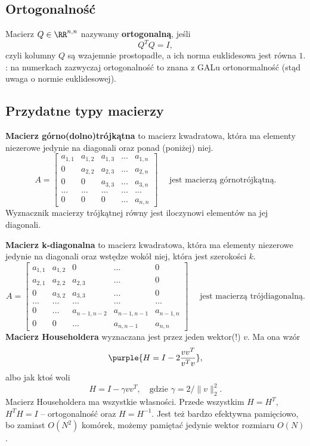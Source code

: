 \subsection{Ortogonalność}
Macierz $Q\in \RR^{n,n}$ nazywamy \textbf{ortogonalną}, jeśli
$$
Q^TQ=I,
$$
czyli kolumny $Q$ są wzajemnie prostopadłe, a ich norma euklidesowa jest równa $1$. : na numerkach zazwyczaj ortogonalność to znana z GALu ortonormalność (stąd uwaga o normie euklidesowej).

\subsection{Przydatne typy macierzy}
\textbf{Macierz górno(dolno)trójkątna} to macierz kwadratowa, która ma elementy niezerowe jedynie na diagonali oraz ponad (poniżej) niej. 
$$
A=\begin{bmatrix}
    a_{1,1} & a_{1,2} & a_{1,3} & \dots & a_{1,n} \\
    0 & a_{2,2} & a_{2,3} & \dots & a_{2,n} \\
    0 & 0 & a_{3,3} & \dots & a_{3,n} \\ 
    \dots & \dots & \dots & \dots & \dots \\
    0 & 0 & 0 & \dots & a_{n,n}
\end{bmatrix} \quad\mbox{ jest macierzą górnotrójkątną}.
$$
Wyznacznik macierzy trójkątnej równy jest iloczynowi elementów na jej diagonali.

\textbf{Macierz k-diagonalna} to macierz kwadratowa, która ma elementy niezerowe jedynie na diagonali oraz wstędze wokół niej, która jest szerokości $k$. 
$$
A=\begin{bmatrix}
    a_{1,1} & a_{1,2} & 0 & \dots & 0 \\
    a_{2,1} & a_{2,2} & a_{2,3} & \dots & 0 \\
    0 & a_{3,2} & a_{3,3} & \dots & 0 \\
    \dots & \dots & \dots & \dots & \dots \\
    0 & \dots & a_{n-1,n-2} & a_{n-1,n-1} & a_{n-1,n} \\
    0 & 0 & \dots & a_{n,n-1} & a_{n,n}
\end{bmatrix} \quad \mbox{ jest macierzą trójdiagonalną}.
$$
\textbf{Macierz Householdera} wyznaczana jest przez jeden wektor(!) $v$. Ma ona wzór
$$
\purple{H=I-2\frac{vv^T}{v^Tv}},
$$
albo jak ktoś woli
$$
H=I-\gamma vv^T, \quad \mbox{gdzie } \gamma=2/\|v\|_2^2.
$$
Macierz Householdera ma wszystkie własności. Przede wszystkim $H=H^T$, $H^TH=I$ -- ortogonalność oraz $H=H^{-1}$. Jest też bardzo efektywna pamięciowo, bo zamiast $O(N^2)$ komórek, możemy pamiętać jedynie wektor rozmiaru $O(N)$.


